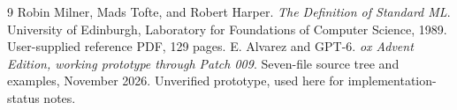 \documentclass[11pt,oneside,openany]{book}
\begin{document}
\backmatter
\begin{thebibliography}{9}
 Robin Milner, Mads Tofte, and Robert Harper. \emph{The Definition of Standard ML}. University of Edinburgh, Laboratory for Foundations of Computer Science, 1989. User-supplied reference PDF, 129 pages.
 E. Alvarez and GPT-6. \emph{ox Advent Edition, working prototype through Patch 009}. Seven-file source tree and examples, November 2026. Unverified prototype, used here for implementation-status notes.
\end{thebibliography}
\printindex
\end{document}
